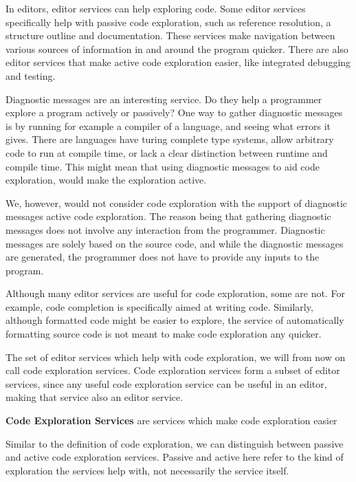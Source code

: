 In editors, editor services can help exploring code.
Some editor services specifically help with passive code exploration, such as reference resolution, a structure outline and documentation.
These services make navigation between various sources of information in and around the program quicker.
There are also editor services that make active code exploration easier, like integrated debugging and testing.

Diagnostic messages are an interesting service.
Do they help a programmer explore a program actively or passively?
One way to gather diagnostic messages is by running for example a compiler of a language, and seeing what errors it gives.
There are languages have turing complete type systems, allow arbitrary code to run at compile time, or lack a clear distinction between runtime and compile time.
This might mean that using diagnostic messages to aid code exploration, would make the exploration active.

We, however, would not consider code exploration with the support of diagnostic messages active code exploration.
The reason being that gathering diagnostic messages does not involve any interaction from the programmer.
Diagnostic messages are solely based on the source code, and while the diagnostic messages are generated,
the programmer does not have to provide any inputs to the program.

Although many editor services are useful for code exploration, some are not.
For example, code completion is specifically aimed at writing code.
Similarly, although formatted code might be easier to explore, the service of automatically formatting source code
is not meant to make code exploration any quicker.

The set of editor services which help with code exploration, we will from now on call code exploration services.
Code exploration services form a subset of editor services, since any useful code exploration service can be useful in an editor,
making that service also an editor service.

\begin{definition}
    \textbf{Code Exploration Services} are services which make code exploration easier
\end{definition}

Similar to the definition of code exploration, we can distinguish between passive and active code exploration services.
Passive and active here refer to the kind of exploration the services help with, not necessarily the service itself.

